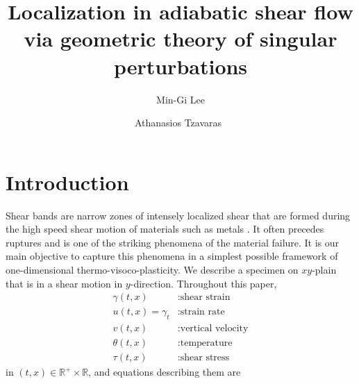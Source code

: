 \documentclass[a4paper,11pt]{article}
\theoremstyle{remark}
\begin{document}
\title{Localization in adiabatic shear flow \\via geometric theory of singular perturbations}
\author{Min-Gi Lee\footnotemark[1] \and Athanasios Tzavaras\footnotemark[1]\  \footnotemark[3]  \footnotemark[4]}
\date{}

\maketitle
\renewcommand{\thefootnote}{\fnsymbol{footnote}}
\renewcommand{\thefootnote}{\arabic{footnote}}


\maketitle

\tableofcontents

\section{Introduction}
Shear bands are narrow zones of intensely localized shear that are formed during the high speed shear motion of materials such as metals \cite{zener_effect_1944}. It often precedes ruptures and is one of the striking phenomena of the material failure. It is our main objective to capture this  phenomena in a simplest possible framework of one-dimensional thermo-visoco-plasticity. We describe a specimen on $xy$-plain that is in a shear motion in $y$-direction. Throughout this paper,
\begin{equation} \label{eq:vars}
\begin{aligned}
 \gamma(t,x) &: \text{shear strain}\\
 u(t,x)=\gamma_t &: \text{strain rate}\\
 v(t,x) &: \text{vertical velocity}\\
 \theta(t,x) &: \text{temperature}\\
 \tau(t,x) &: \text{shear stress}
\end{aligned}
\end{equation}
in $(t,x)\in \mathbb{R}^+ \times \mathbb{R}$, and equations describing them are
\end{document}
